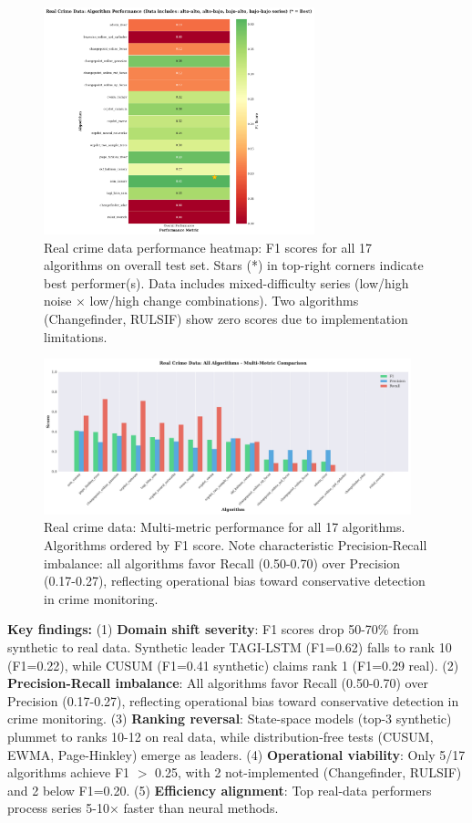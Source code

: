 \documentclass[journal,article,submit,pdftex,moreauthors]{Definitions/mdpi}
\begin{document}
\begin{figure}[H]
\centering
\includegraphics[width=0.70\textwidth]{figures/fig_real_heatmap.pdf}
\caption{Real crime data performance heatmap: F1 scores for all 17 algorithms on overall test set. Stars (*) in top-right corners indicate best performer(s). Data includes mixed-difficulty series (low/high noise × low/high change combinations). Two algorithms (Changefinder, RULSIF) show zero scores due to implementation limitations.}
\label{fig:real_heatmap}
\end{figure}

\begin{figure}[H]
\centering
\includegraphics[width=0.95\textwidth]{figures/fig_real_barplot.pdf}
\caption{Real crime data: Multi-metric performance for all 17 algorithms. Algorithms ordered by F1 score. Note characteristic Precision-Recall imbalance: all algorithms favor Recall (0.50-0.70) over Precision (0.17-0.27), reflecting operational bias toward conservative detection in crime monitoring.}
\label{fig:real_barplot}
\end{figure}

\textbf{Key findings:} (1) \textbf{Domain shift severity}: F1 scores drop 50-70\% from synthetic to real data. Synthetic leader TAGI-LSTM (F1=0.62) falls to rank 10 (F1=0.22), while CUSUM (F1=0.41 synthetic) claims rank 1 (F1=0.29 real). (2) \textbf{Precision-Recall imbalance}: All algorithms favor Recall (0.50-0.70) over Precision (0.17-0.27), reflecting operational bias toward conservative detection in crime monitoring. (3) \textbf{Ranking reversal}: State-space models (top-3 synthetic) plummet to ranks 10-12 on real data, while distribution-free tests (CUSUM, EWMA, Page-Hinkley) emerge as leaders. (4) \textbf{Operational viability}: Only 5/17 algorithms achieve F1 $>$ 0.25, with 2 not-implemented (Changefinder, RULSIF) and 2 below F1=0.20. (5) \textbf{Efficiency alignment}: Top real-data performers process series 5-10× faster than neural methods.
\end{document}
